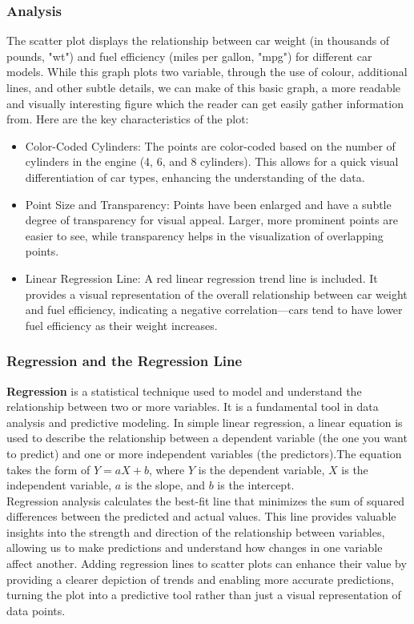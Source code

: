 \documentclass{article}\usepackage[]{graphicx}\usepackage[]{xcolor}
\begin{document}
\subsubsection{Analysis}
The scatter plot displays the relationship between car weight (in thousands of pounds, "wt") and fuel efficiency (miles per gallon, "mpg") for different car models. While this graph plots two variable, through the use of colour, additional lines, and other subtle details, we can make of this basic graph, a more readable and visually interesting figure which the reader can get easily gather information from. Here are the key characteristics of the plot:
\begin{itemize}
    \item Color-Coded Cylinders: The points are color-coded based on the number of cylinders in the engine (4, 6, and 8 cylinders). This allows for a quick visual differentiation of car types, enhancing the understanding of the data.
    \item Point Size and Transparency: Points have been enlarged and have a subtle degree of transparency for visual appeal. Larger, more prominent points are easier to see, while transparency helps in the visualization of overlapping points.
    \item Linear Regression Line: A red linear regression trend line is included. It provides a visual representation of the overall relationship between car weight and fuel efficiency, indicating a negative correlation—cars tend to have lower fuel efficiency as their weight increases.\\
\end{itemize}

\subsubsection{Regression and the Regression Line}
\textbf{Regression} is a statistical technique used to model and understand the relationship between two or more variables. It is a fundamental tool in data analysis and predictive modeling. In simple linear regression, a linear equation is used to describe the relationship between a dependent variable (the one you want to predict) and one or more independent variables (the predictors).The equation takes the form of \(Y = aX + b\), where \(Y\) is the dependent variable, \(X\) is the independent variable, \(a\) is the slope, and \(b\) is the intercept.\\
Regression analysis calculates the best-fit line that minimizes the sum of squared differences between the predicted and actual values. This line provides valuable insights into the strength and direction of the relationship between variables, allowing us to make predictions and understand how changes in one variable affect another. Adding regression lines to scatter plots can enhance their value by providing a clearer depiction of trends and enabling more accurate predictions, turning the plot into a predictive tool rather than just a visual representation of data points.
\end{document}
